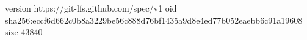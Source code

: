 version https://git-lfs.github.com/spec/v1
oid sha256:eccf6d662c0b8a3229be56c888d76bf1435a9d8e4ed77b052eaebb6c91a19608
size 43840
